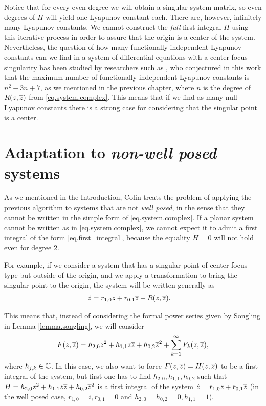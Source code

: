 Notice that for every even degree we will obtain a singular system matrix, so even degrees of $H$ will yield one Lyapunov constant each. There are, however, infinitely many Lyapunov constants. We cannot construct the \emph{full} first integral $H$ using this iterative process in order to assure that the origin is a center of the system. Nevertheless, the question of how many functionally independent Lyapunov constants can we find in a system of differential equations with a center-focus singularity has been studied by researchers such as \textcite{Gine2007}, who conjectured in this work that the maximum number of functionally independent Lyapunov constants is $n^2-3n+7$, as we mentioned in the previous chapter, where $n$ is the degree of $R(z,\overline{z})$ from \eqref{eq.system.complex}. This means that if we find as many null Lyapunov constants there is a strong case for considering that the singular point is a center.


\section{Adaptation to \emph{non-well posed} systems}

As we mentioned in the Introduction, Colin \textcite{Christopher2006} treats the problem of applying the previous algorithm to systems that are not \emph{well posed}, in the sense that they cannot be written in the simple form of \eqref{eq.system.complex}. If a planar system cannot be written as in \eqref{eq.system.complex}, we cannot expect it to admit a first integral of the form \eqref{eq.first_integral}, because the equality $\dot H=0$ will not hold even for degree 2.

For example, if we consider a system that has a singular point of center-focus type but outside of the origin, and we apply a transformation to bring the singular point to the origin, the system will be written generally as
\begin{align}
\dot z&= r_{1,0}z+r_{0,1}\overline{z}+R(z,\overline{z}).
\end{align}

This means that, instead of considering the formal power series given by Songling in Lemma \ref{lemma.songling}, we will consider
\begin{align}
F(z,\overline{z})=h_{2,0}z^2+h_{1,1}z\overline{z}+h_{0,2}\overline{z}^2+\sum_{k=1}^\infty F_k(z,\overline{z}),
\end{align}
where $h_{j,k}\in\mathbb{C}$. In this case, we also want to force $F(z,\overline{z})=H(z,\overline{z})$ to be a first integral of the system, but first one has to find $h_{2,0},h_{1,1},h_{0,2}$ such that $H=h_{2,0}z^2+h_{1,1}z\overline{z}+h_{0,2}\overline{z}^2$ is a first integral of the system $\dot z=r_{1,0}z+r_{0,1}\overline{z}$ (in the well posed case, $r_{1,0}=i,r_{0,1}=0$ and $h_{2,0}=h_{0,2}=0,h_{1,1}=1$).

